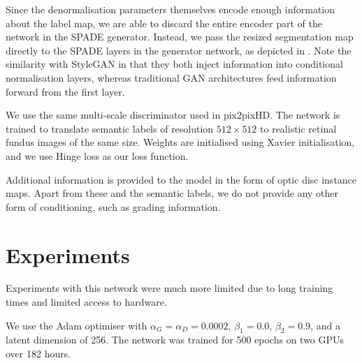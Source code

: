 Since the denormalisation parameters themselves encode enough information about the label map, we are able to discard the entire encoder part of the network in the SPADE generator.
Instead, we pass the resized segmentation map directly to the SPADE layers in the generator network, 
as depicted in .
Note the similarity with StyleGAN in that they both inject information into conditional normalisation layers, whereas traditional GAN architectures feed information forward from the first layer.

We use the same multi-scale discriminator used in pix2pixHD.
The network is trained to translate semantic labels of resolution $512\times512$ to realistic retinal fundus images of the same size.
Weights are initialised using Xavier initialisation, and we use Hinge loss as our loss function.

Additional information is provided to the model in the form of optic disc instance maps.
Apart from these and the semantic labels, we do not provide any other form of conditioning, such as grading information.

\section{Experiments}

Experiments with this network were much more limited due to long training times and limited access to hardware.

We use the Adam optimiser with $\alpha_G = \alpha_D = 0.0002$, $\beta_1 = 0.0$, $\beta_2 = 0.9$, and a latent dimension of 256.
The network was trained for 500 epochs on two GPUs over 182 hours.

